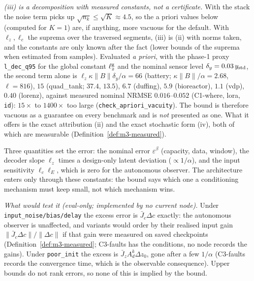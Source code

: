 \emph{(iii) is a decomposition with measured constants, not a certificate.}  With
the stack the noise term picks up $\sqrt{n_k}\le\sqrt K\approx4.5$, so the a priori values below (computed for $K=1$)
are, if anything, more vacuous for the default. With $\ell_z,\ell_c$ the suprema over the
traversed segments, (iii) is (ii) with norms taken, and the constants are only known after the fact (lower bounds of the
suprema when estimated from samples). Evaluated \emph{a priori}, with the phase-1 proxy \texttt{l\_dec\_q95} for the global
constant $\ell^{\rm g}_z$ and the nominal sensor level $\delta_y=0.03\,y_{\rm std}$, the second term alone is
$\ell_z\kappa\|B\|\delta_y/\alpha=66$ (battery; $\kappa\|B\|/\alpha=2.68$, $\ell=816$), $15$ (quad\_tank; $37.4$, $13.5$),
$6.7$ (duffing), $5.9$ (bioreactor), $1.1$ (vdp), $0.40$ (lorenz), against measured nominal NRMSE $0.016$--$0.052$
(C1-where, lora, \texttt{id}): $15\times$ to $1400\times$ too large (\texttt{check\_apriori\_vacuity}). The bound is therefore
vacuous as a guarantee on every benchmark and is \emph{not} presented as one. What it offers is the exact attribution
(ii) and the exact stochastic form (iv), both of which are measurable (Definition~\ref{def:m3-measured}).

\begin{remark}\label{rem:m3-knobs}
Three quantities set the error: the nominal error $\varepsilon^\beta$ (capacity, data, window),
the decoder slope $\ell_z$ times a design-only latent deviation ($\propto1/\alpha$), and the input
sensitivity $\ell_c\ell_E$, which is zero for the autonomous observer. The architecture enters only
through these constants: the bound says which one a conditioning mechanism must keep small, not
which mechanism wins.
\end{remark}

\emph{What would test it (eval-only; implemented by no current node).} Under \texttt{input\_noise/bias/delay} the
excess error is $\bar J_c\Delta c$ exactly: the autonomous observer is unaffected, and variants would order by their
realised input gain $\|\bar J_c\Delta c\|/\|\Delta c\|$ if that gain were measured on saved checkpoints
(Definition~\ref{def:m3-measured}; C3-faults has the conditions, no node records the gains). Under \texttt{poor\_init}
the excess is $\bar J_zA_d^k\Delta z_0$, gone after a few $1/\alpha$ (C3-faults records the convergence time, which is
the observable consequence). Upper bounds do not rank errors, so none of this is implied by the bound.

